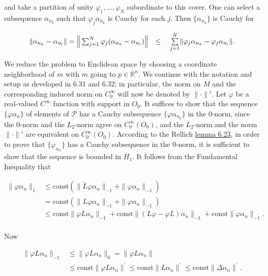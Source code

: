 and take a partition of unity $\varphi_{1},\ldots,\varphi_{N}$ subordinate to this cover. One can select a subsequence $\alpha_{n_{k}}$ such that $\varphi_{j}\alpha_{n_{k}}$ is Cauchy for each $j$. Then $\{\alpha_{n_{k}}\}$ is Cauchy for

\[
\begin{array}{r l}{\|\alpha_{n_{k}}-\alpha_{n_{l}}\|=\Big\|\sum_{j=1}^{N}\varphi_{j}(\alpha_{n_{k}}-\alpha_{n_{l}})\Big\|}&{\leq\quad\underset{j=1}{\overset{N}{\sum}}\|\varphi_{j}\alpha_{n_{k}}-\varphi_{j}\alpha_{n_{l}}\|.}\end{array}
\]

We reduce the problem to Euclidean space by choosing a coordinate neighborhood of $m$ with $m$ going to $p \in \mathbb{R}^n$. We continue with the notation and setup as developed in 6.31 and 6.32; in particular, the norm on $M$ and the corresponding induced norm on $C_0^\infty$ will now be denoted by $\|\cdot\|'$. Let $\varphi$ be a real-valued $C^\infty$ function with support in $O_0$. It suffices to show that the sequence $\{\varphi\alpha_{n}\}$ of elements of $\mathcal{P}$ has a Cauchy subsequence $\{\varphi\alpha_{n_{k}}\}$ in the 0-norm, since the 0-norm and the $L_2$-norm agree on $C_0^\infty(O_0)$, and the $L_2$-norm and the norm $\|\cdot\|'$ are equivalent on $C_0^\infty(O_0)$. According to the Rellich \hyperref[thm:6.23]{lemma 6.23}, in order to prove that $\{\varphi_{\alpha_n}\}$ has a Cauchy subsequence in the 0-norm, it is sufficient to show that the sequence is bounded in $H_1$. It follows from the Fundamental Inequality that

\begin{equation}
\tag{1}\label{eq:6.33:1}
\begin{aligned}{\|\varphi\alpha_{n}\|_{1}}&{{}\leq\mathrm{const}\left(\|\tilde{L}\varphi\alpha_{n}\|_{-1}+\|\varphi\alpha_{n}\|_{-1}\right)}\\ {}&{{}=\mathrm{const}\left(\|L\varphi\alpha_{n}\|_{-1}+\|\varphi\alpha_{n}\|_{-1}\right)}\\ {}&{{}\leq\mathrm{const}\|\varphi L\alpha_{n}\|_{-1}+\mathrm{const}\|(L\varphi-\varphi L)\alpha_{n}\|_{-1}+\mathrm{const}\|\varphi\alpha_{n}\|_{-1}.}\\ \end{aligned}
\end{equation}

Now

\begin{equation}
\tag{2}\label{eq:6.33:2}
\begin{aligned}{\|\varphi L\alpha_{n}\|_{-1}}&{{}\leq\|\varphi L\alpha_{n}\|_{0}=\|\varphi L\alpha_{n}\|}\\ {}&{{}\leq\mathrm{const}\|\varphi L\alpha_{n}\|^{\prime}\leq\mathrm{const}\|L\alpha_{n}\|^{\prime}\leq\mathrm{const}\|\Delta\alpha_{n}\|^{\prime}.}\\ \end{aligned}
\end{equation}

